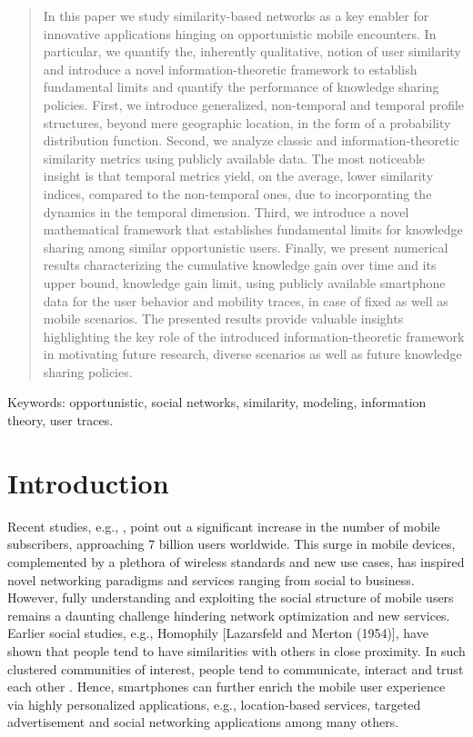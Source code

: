 \documentclass[12pt,epsf]{article}
\theoremstyle{definition}
\begin{document}
\vspace{-0.5 cm}
\begin{abstract}
In this paper we study similarity-based networks as a key enabler 
for innovative applications hinging on opportunistic mobile 
encounters. In particular, we quantify the, inherently qualitative, 
notion of user similarity and introduce a novel information-theoretic 
framework to establish fundamental limits and quantify the performance of knowledge 
sharing policies. First, we introduce generalized, non-temporal and 
temporal profile structures, beyond mere geographic location, in the form of 
a probability distribution function. Second, we analyze classic and 
information-theoretic similarity metrics using publicly available data. 
The most noticeable insight is that temporal metrics yield, on the average, 
lower similarity indices, compared to the non-temporal ones, due to incorporating 
the dynamics in the temporal dimension. Third, we introduce a novel 
mathematical framework that establishes fundamental limits for knowledge sharing 
among similar opportunistic users. Finally, 
we present numerical results characterizing the cumulative knowledge gain over 
time and its upper bound, knowledge gain limit, using publicly available 
smartphone data for the user behavior and mobility traces, in case of fixed 
as well as mobile scenarios. The presented results provide valuable insights 
highlighting the key role of the introduced information-theoretic 
framework in motivating future research, diverse scenarios as 
well as future knowledge sharing policies.
\end{abstract}

\noindent Keywords: opportunistic, social networks, similarity, modeling, information theory, user traces.
\vspace{-0.7 cm}
\section{Introduction}
\vspace{-0.4 cm}
Recent studies, e.g., \cite{itu14}, point out a significant increase
in the number of mobile subscribers, approaching $7$ billion users worldwide. 
This surge in mobile devices, complemented by a plethora of wireless 
standards and new use cases,
has inspired novel networking paradigms and services ranging from
social \cite{Isoc,ga} to business. However, fully understanding
and exploiting the social structure of mobile users remains a daunting
challenge hindering network optimization and new services. Earlier
social studies, e.g., Homophily {[}Lazarsfeld and Merton (1954){]},
have shown that people tend to have similarities with others in close
proximity. In such clustered communities of interest, people tend to 
communicate, interact and trust each other \cite{csi}.
Hence, smartphones can further enrich the mobile user experience
via highly personalized applications, e.g., location-based services,
targeted advertisement and social networking applications among many others. 
\end{document}
